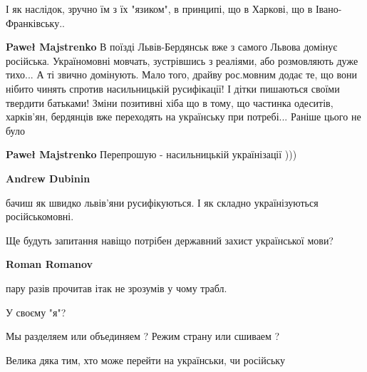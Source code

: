 \begin{itemize}
\begin{itemize}
І як наслідок, зручно їм з їх "язиком", в принципі, що в Харкові, що в Івано-Франківську..

 
\textbf{Paweł Majstrenko} В поїзді Львів-Бердянськ вже з самого Львова домінує російська. Україномовні мовчать, зустрівшись з реаліями, або розмовляють дуже тихо... А ті звично домінують. Мало того, драйву рос.мовним додає те, що вони нібито чинять спротив насильницькій русифікації! І дітки пишаються своїми твердити батьками! Зміни позитивні хіба що в тому, що частинка одеситів, харків'ян, бердянців вже переходять на українську при потребі... Раніше цього не було

 
\textbf{Paweł Majstrenko} Перепрошую - насильницькій українізації )))
\end{itemize}

 
\textbf{Andrew Dubinin} 

бачиш як швидко львів'яни русифікуються. І як складно українізуються
російськомовні.

Ще будуть запитання навіщо потрібен державний захист української мови?

\begin{itemize}


\textbf{Roman Romanov} 

пару разів прочитав ітак не зрозумів у чому трабл.

У своєму "я"?

Мы разделяем или объединяем ? Режим страну или сшиваем ?

Велика дяка тим, хто може перейти на українськи, чи російську


\end{itemize}
\end{itemize}
